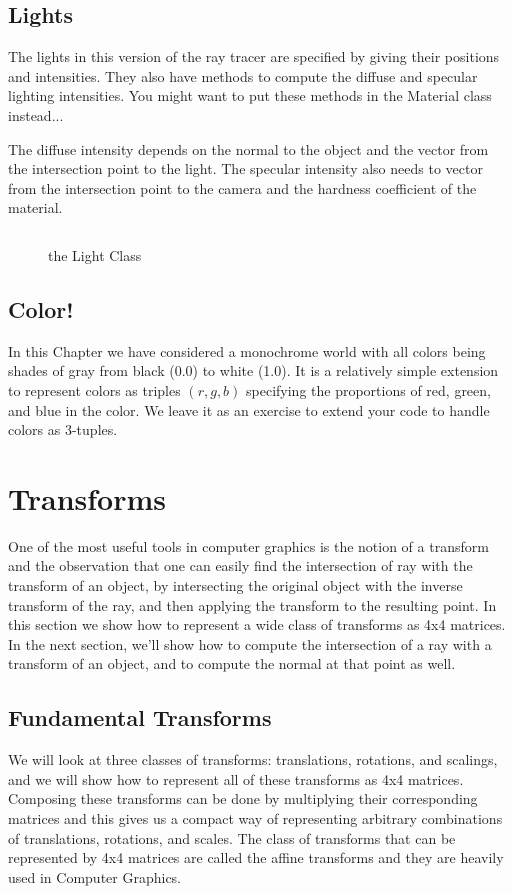 \documentclass{book}
\begin{document}
\section{Lights}
The lights in this version of the ray tracer are specified by giving
their positions and intensities.
They also have methods to compute the diffuse and specular lighting intensities.
You might want to put these methods in the Material class instead...

The diffuse intensity depends on the normal to the object and the vector from the
intersection point to the light.
The specular intensity also needs to vector from the intersection point to the camera
and the hardness coefficient of the material.


\begin{figure}
\begin{verbatim}
\end{verbatim}

\caption{the Light Class \label{fig:LightClass}}
\end{figure}

\section{Color!}
In this Chapter we have considered a monochrome world with all colors being shades of gray from black (0.0) to white (1.0).  It is a relatively simple extension to represent colors as triples $(r,g,b)$ specifying the proportions of red, green, and blue in the color.   We leave it as an exercise to extend your code to handle colors as 3-tuples.



\chapter{Transforms \label{chap:transforms}}

One of the most useful tools in computer graphics is the notion of a transform
and the observation that one can easily find the intersection of ray with the transform
of an object, by intersecting the original object with the inverse transform of the ray,
and then applying the transform to the resulting point. In this section we show how to
represent a wide class of transforms as 4x4 matrices. In the next section, we'll show how
to compute the intersection of a ray with a transform of an object, and to compute the
normal at that point as well.

\section{Fundamental Transforms}
We will look at three classes of transforms: translations, rotations, and scalings,
and we will show how to represent all of these transforms as 4x4 matrices. Composing these
transforms can be done by multiplying their corresponding matrices and this gives us
a compact way of representing arbitrary combinations of translations, rotations, and scales.
The class of transforms that can be represented by 4x4 matrices are called the affine transforms
and they are heavily used in Computer Graphics.
\end{document}
